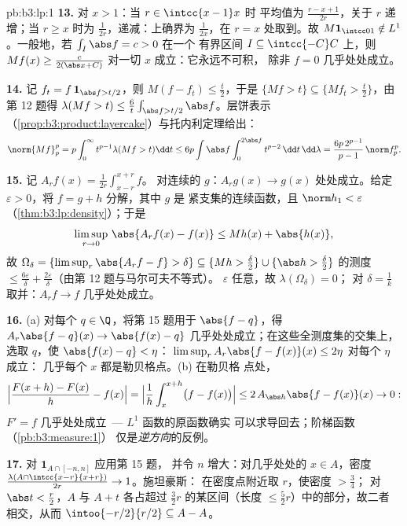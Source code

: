 \begin{solution}{pb:b3:lp:1}
\textbf{13.} 对 $x > 1$：当 $r \in \intcc{x-1}x$ 时
平均值为 $\frac{r - x + 1}{2r}$，关于 $r$ 递增；当 $r
\geq x$ 时为 $\frac1{2r}$，递减：上确界为
$\frac1{2x}$，在 $r = x$ 处取到。故 $M\mathbf 1_{\intcc01}
\notin L^1$。一般地，若 $\int_I\abs f = c > 0$ 在一个
有界区间 $I \subseteq \intcc{-C}C$ 上，则 $Mf(x) \geq
\frac{c}{2(\abs x + C)}$ 对一切 $x$ 成立：它永远不可积，
除非 $f = 0$ 几乎处处成立。

\textbf{14.} 记 $f_t = f\,\mathbf 1_{\abs f > t/2}$，则
$M(f - f_t) \leq \frac t2$，于是 $\{Mf > t\} \subseteq \{Mf_t
> \frac t2\}$，由第 12 题得 $\lambda(Mf > t) \leq
\frac6t\int_{\abs f > t/2}\abs f$。层饼表示
（\cref{prop:b3:product:layercake}）与托内利定理给出：
\[
\norm{Mf}_p^p = p\int_0^\infty t^{p-1}\lambda(Mf > t)\dd t
\leq 6p\int\abs f\int_0^{2\abs f}t^{p-2}\,\dd t\,\dd\lambda
= \frac{6p\,2^{p-1}}{p-1}\,\norm f_p^p .
\]

\textbf{15.} 记 $A_rf(x) = \frac1{2r}\int_{x-r}^{x+r}f$。
对连续的 $g$：$A_rg(x) \to g(x)$ 处处成立。给定
$\varepsilon > 0$，将 $f = g + h$ 分解，其中 $g$ 是
紧支集的连续函数，且 $\norm h_1 < \varepsilon$
（\cref{thm:b3:lp:density}）；于是
\[
\limsup_{r\to0}\,\abs{A_rf(x) - f(x)} \leq Mh(x) +
\abs{h(x)},
\]
故 $\Omega_\delta = \{\limsup_r\abs{A_rf - f} > \delta\}
\subseteq \{Mh > \tfrac\delta2\} \cup \{\abs h >
\tfrac\delta2\}$ 的测度 $\leq \frac{6\varepsilon}\delta
+ \frac{2\varepsilon}\delta$（由第 12 题与马尔可夫不等式）。
$\varepsilon$ 任意，故 $\lambda(\Omega_\delta) = 0$；
对 $\delta = \frac1k$ 取并：$A_rf \to f$ 几乎处处成立。

\textbf{16.} (a) 对每个 $q \in \Q$，将第 15 题用于
$\abs{f - q}$，得 $A_r\abs{f - q}(x) \to \abs{f(x) - q}$
几乎处处成立；在这些全测度集的交集上，选取
$q$，使 $\abs{f(x) - q} < \eta$：
$\limsup_rA_r\abs{f - f(x)}(x) \leq 2\eta$ 对每个 $\eta$ 成立：
几乎每个 $x$ 都是勒贝格点。(b) 在勒贝格
点处，
\[
\Bigl|\frac{F(x + h) - F(x)}h - f(x)\Bigr|
= \Bigl|\frac1h\int_x^{x+h}\bigl(f - f(x)\bigr)\Bigr|
\leq 2\,A_{\abs h}\abs{f - f(x)}(x) \to 0 :
\]
$F' = f$ 几乎处处成立\ --- $L^1$ 函数的原函数确实
可以求导回去；阶梯函数（\cref{pb:b3:measure:1}）
仅是\emph{逆方向}的反例。

\textbf{17.} 对 $\mathbf 1_{A\cap[-n,n]}$ 应用第 15 题，
并令 $n$ 增大：对几乎处处的 $x \in A$，密度
$\frac{\lambda(A\cap\intcc{x-r}{x+r})}{2r} \to 1$。施坦豪斯：
在密度点附近取 $r$，使密度 $> \frac34$；
对 $\abs t < \frac r2$，$A$ 与 $A + t$ 各占超过
$\frac32r$ 的某区间（长度 $\leq \frac52r$）中的部分，故二者
相交，从而 $\intoo{-r/2}{r/2} \subseteq A - A$。


\end{solution}
